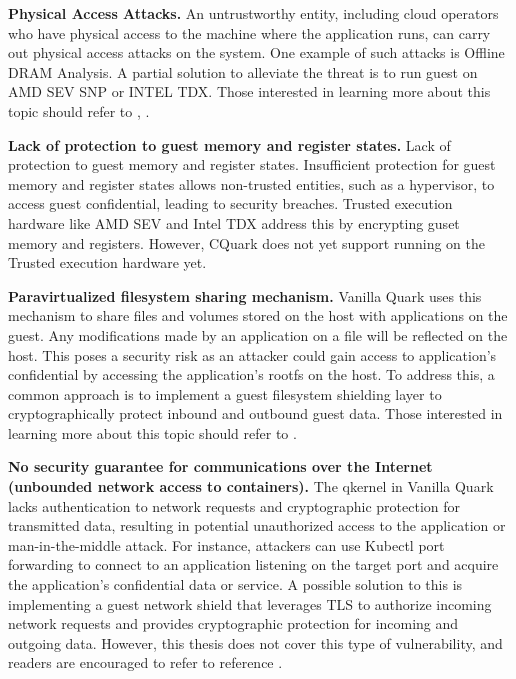 \textbf{Physical Access Attacks.} An untrustworthy entity, including cloud operators who have physical access to the machine where the application runs, can carry out physical access attacks on the system. One example of such attacks 
is Offline DRAM Analysis. A partial solution to alleviate the threat is to run guest on AMD SEV SNP or INTEL TDX.  Those interested in learning more about this topic should refer to \cite*{SEV_SNP_white_book}, \cite*{DBLP:journals/corr/abs-2303-15540}.


\textbf{Lack of protection to guest memory and register states.} Lack of protection to guest memory and register states.  Insufficient protection for guest memory and register states allows non-trusted entities, such as a hypervisor, to access guest confidential, leading to security breaches. 
Trusted execution hardware like AMD SEV\cite*{SEV_SNP_white_book} and Intel TDX\cite*{Intel_tdx_whitepaper} address this by encrypting guset memory and registers. However, CQuark does not yet support running on the Trusted execution hardware yet.


\textbf{Paravirtualized filesystem sharing mechanism.} Vanilla Quark uses this mechanism to share files and volumes stored on the host with applications on the guest. Any modifications made by an application on a file will be reflected on the host. This poses a security risk as an attacker could 
gain access to application’s confidential by accessing the application's rootfs on the host. To address this, a common approach is to implement a guest filesystem shielding layer to cryptographically protect inbound and outbound guest data. Those interested in learning more about this topic should 
refer to \cite*{file_system_shield}.


\textbf{No security guarantee for communications over the Internet (unbounded network access to containers).} The qkernel in Vanilla Quark lacks authentication to network requests and cryptographic protection for transmitted data, resulting in potential unauthorized access to the application or 
man-in-the-middle attack\cite*{Man_in_the_middle_attack}. For instance, attackers can use Kubectl port forwarding to connect to an application listening on the target port and acquire the application’s confidential data or service. A possible solution to this is implementing a guest network shield that leverages TLS to authorize 
incoming network requests and provides cryptographic protection for incoming and outgoing data. However, this thesis does not cover this type of vulnerability, and readers are encouraged to refer to reference \cite*{network_shiled}.

